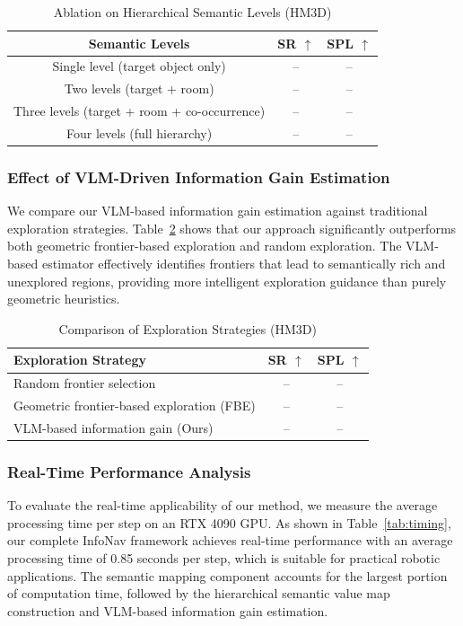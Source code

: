\documentclass[conference]{IEEEtran}
\begin{document}
\begin{table}[t]
\centering
\caption{Ablation on Hierarchical Semantic Levels (HM3D)}
\label{tab:ablation_semantic}
\begin{tabular}{c|cc}
\toprule
Semantic Levels & SR $\uparrow$ & SPL $\uparrow$ \\
\midrule
Single level (target object only) & -- & -- \\
Two levels (target + room) & -- & -- \\
Three levels (target + room + co-occurrence) & -- & -- \\
Four levels (full hierarchy) & -- & -- \\
\bottomrule
\end{tabular}
\end{table}

\subsubsection{Effect of VLM-Driven Information Gain Estimation}

We compare our VLM-based information gain estimation against traditional exploration strategies. Table~\ref{tab:ablation_ig} shows that our approach significantly outperforms both geometric frontier-based exploration and random exploration. The VLM-based estimator effectively identifies frontiers that lead to semantically rich and unexplored regions, providing more intelligent exploration guidance than purely geometric heuristics.

\begin{table}[t]
\centering
\caption{Comparison of Exploration Strategies (HM3D)}
\label{tab:ablation_ig}
\begin{tabular}{l|cc}
\toprule
Exploration Strategy & SR $\uparrow$ & SPL $\uparrow$ \\
\midrule
Random frontier selection & -- & -- \\
Geometric frontier-based exploration (FBE) & -- & -- \\
VLM-based information gain (Ours) & -- & -- \\
\bottomrule
\end{tabular}
\end{table}

\subsubsection{Real-Time Performance Analysis}

To evaluate the real-time applicability of our method, we measure the average processing time per step on an RTX 4090 GPU. As shown in Table~\ref{tab:timing}, our complete InfoNav framework achieves real-time performance with an average processing time of 0.85 seconds per step, which is suitable for practical robotic applications. The semantic mapping component accounts for the largest portion of computation time, followed by the hierarchical semantic value map construction and VLM-based information gain estimation.
\end{document}
